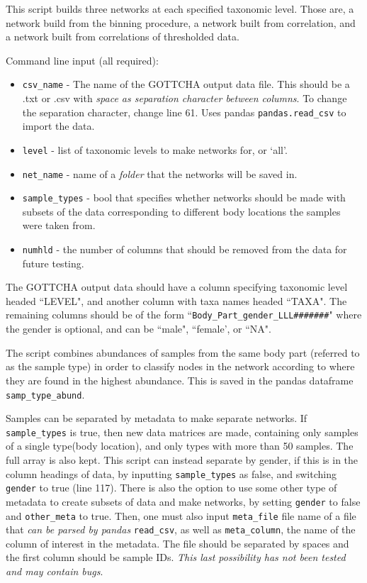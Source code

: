 \documentclass[10pt]{article}
\theoremstyle{definition}
\numberwithin{theorem}{section}
\numberwithin{definition}{section}
\numberwithin{lemma}{section}
\numberwithin{corollary}{section}
\numberwithin{clm}{section}
\numberwithin{rmk}{section}
\begin{document}
This script builds three networks at each specified taxonomic level. Those are, a network build from the binning procedure, a network built from correlation, and a network built from correlations of thresholded data.

Command line input (all required):
\begin{itemize}
	\item \verb|csv_name| - The name of the GOTTCHA output data file. This should be a .txt or .csv with \emph{space as separation character between columns}. To change the separation character, change line 61. Uses pandas \verb|pandas.read_csv| to import the data.
	\item \verb|level| - list of taxonomic levels to make networks for, or `all'. 
	\item \verb|net_name| - name of a \emph{folder} that the networks will be saved in.
	\item \verb|sample_types| - bool that specifies whether networks should be made with subsets of the data corresponding to different body locations the samples were taken from.
	\item \verb|numhld| - the number of columns that should be removed from the data for future testing.
\end{itemize}

The GOTTCHA output data should have a column specifying taxonomic level headed ``LEVEL", and another column with taxa names headed ``TAXA". The remaining columns should be of the form ``\verb|Body_Part_gender_LLL#######|" where the gender is optional, and can be ``male", ``female', or ``NA". 

The script combines abundances of samples from the same body part (referred to as the sample type) in order to classify nodes in the network according to where they are found in the highest abundance. This is saved in the pandas dataframe \verb|samp_type_abund|. 

Samples can be separated by metadata to make separate networks. If \verb|sample_types| is true, then new data matrices are made, containing only samples of a single type(body location), and only types with more than 50 samples. The full array is also kept. This script can instead separate by gender, if this is in the column headings of data, by inputting \verb|sample_types| as false, and switching \verb|gender| to true (line 117). There is also the option to use some other type of metadata to create subsets of data and make networks, by setting \verb|gender| to false and \verb|other_meta| to true. Then, one must also input \verb|meta_file| file name of a file that \emph{can be parsed by pandas} \verb|read_csv|, as well as \verb|meta_column|, the name of the column of interest in the metadata. The file should be separated by spaces and the first column should be sample IDs. \emph{This last possibility has not been tested and may contain bugs}.
\end{document}
